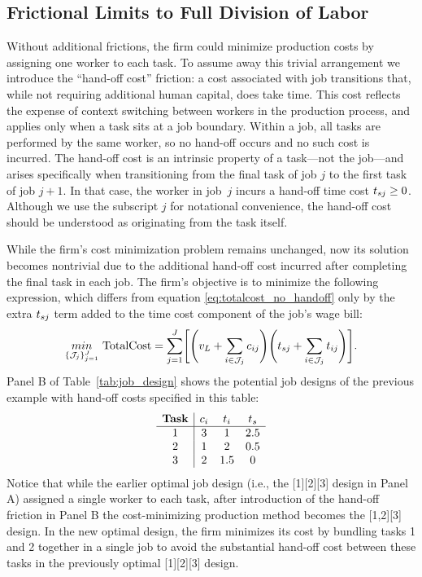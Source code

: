 \documentclass{article}
\theoremstyle{plain}
\theoremstyle{plain}
\begin{document}
\subsection{Frictional Limits to Full Division of Labor}
Without additional frictions, the firm could minimize production costs by assigning one worker to each task.
To assume away this trivial arrangement we introduce the ``hand-off cost” friction: a cost associated with job transitions that, while not requiring additional human capital, does take time.
This cost reflects the expense of context switching between workers in the production process, and applies only when a task sits at a job boundary.  
Within a job, all tasks are performed by the same worker, so no hand-off occurs and no such cost is incurred.
The hand-off cost is an intrinsic property of a task---not the job---and arises specifically when transitioning from the final task of job $j$ to the first task of job $j+1$.  
In that case, the worker in job~$j$ incurs a hand-off time cost $t_{sj} \ge 0$.
Although we use the subscript $j$ for notational convenience, the hand-off cost should be understood as originating from the task itself.

While the firm's cost minimization problem remains unchanged, now its solution becomes nontrivial due to the additional hand-off cost incurred after completing the final task in each job.  
The firm's objective is to minimize the following expression, which differs from equation \ref{eq:totalcost_no_handoff} only by the extra $t_{sj}$ term added to the time cost component of the job's wage bill:
\begin{align}
\label{eq:totalcost_with_handoff}
\underset{\{\mathcal{J}_j\}_{j=1}^J}{min} \ 
\text{TotalCost} = \sum_{j=1}^J \Biggl[\Biggl(v_L + \sum_{i \in \mathcal{J}_j} \hccost{ij} \Biggr) \Biggl(\handofftime{j} + \sum_{i \in \mathcal{J}_j} \timecost{ij} \Biggr)\Biggr].
\end{align}
Panel B of Table~\ref{tab:job_design} shows the potential job designs of the previous example with hand-off costs specified in this table:
\[
\begin{array}{c|ccc}
\textbf{Task} & c_{i} & t_{i} & t_{s} \\ \hline
1 & 3  & 1   & 2.5 \\
2 & 1 & 2   & 0.5 \\
3 & 2   & 1.5 & 0 \\
\end{array}
\]
Notice that while the earlier optimal job design (i.e., the [1][2][3] design in Panel A) assigned a single worker to each task, after introduction of the hand-off friction in Panel B the cost-minimizing production method becomes the [1,2][3] design.
In the new optimal design, the firm minimizes its cost by bundling tasks 1 and 2 together in a single job to avoid the substantial hand-off cost between these tasks in the previously optimal [1][2][3] design.
\end{document}
